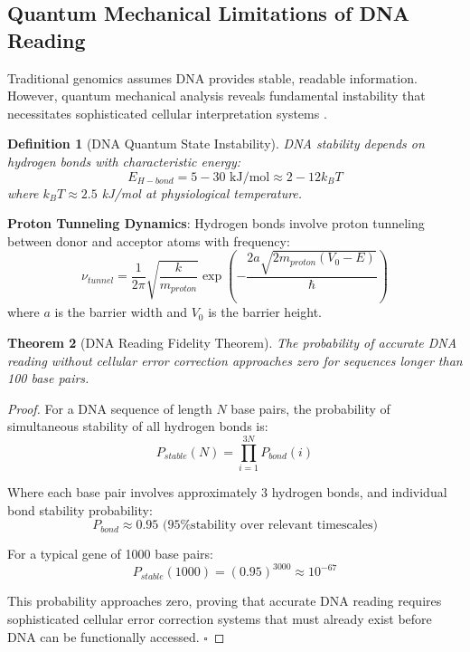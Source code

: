 \documentclass[12pt,a4paper]{article}
\newtheorem{theorem}{Theorem}[section]
\newtheorem{definition}[theorem]{Definition}
\begin{document}
\subsection{Quantum Mechanical Limitations of DNA Reading}

Traditional genomics assumes DNA provides stable, readable information. However, quantum mechanical analysis reveals fundamental instability that necessitates sophisticated cellular interpretation systems \cite{ball2008water, schulten1999biomolecular}.

\begin{definition}[DNA Quantum State Instability]
DNA stability depends on hydrogen bonds with characteristic energy:
\begin{equation}
E_{H-bond} = 5-30 \text{ kJ/mol} \approx 2-12 k_BT
\end{equation}
where $k_BT \approx 2.5$ kJ/mol at physiological temperature.
\end{definition}

\textbf{Proton Tunneling Dynamics}: Hydrogen bonds involve proton tunneling between donor and acceptor atoms with frequency:
\begin{equation}
\nu_{tunnel} = \frac{1}{2\pi} \sqrt{\frac{k}{m_{proton}}} \exp\left(-\frac{2a\sqrt{2m_{proton}(V_0-E)}}{\hbar}\right)
\end{equation}
where $a$ is the barrier width and $V_0$ is the barrier height.

\begin{theorem}[DNA Reading Fidelity Theorem]
The probability of accurate DNA reading without cellular error correction approaches zero for sequences longer than 100 base pairs.
\end{theorem}

\begin{proof}
For a DNA sequence of length $N$ base pairs, the probability of simultaneous stability of all hydrogen bonds is:
\begin{equation}
P_{stable}(N) = \prod_{i=1}^{3N} P_{bond}(i)
\end{equation}

Where each base pair involves approximately 3 hydrogen bonds, and individual bond stability probability:
\begin{equation}
P_{bond} \approx 0.95 \text{ (95\% stability over relevant timescales)}
\end{equation}

For a typical gene of 1000 base pairs:
\begin{equation}
P_{stable}(1000) = (0.95)^{3000} \approx 10^{-67}
\end{equation}

This probability approaches zero, proving that accurate DNA reading requires sophisticated cellular error correction systems that must already exist before DNA can be functionally accessed. $\square$
\end{proof}
\end{document}

